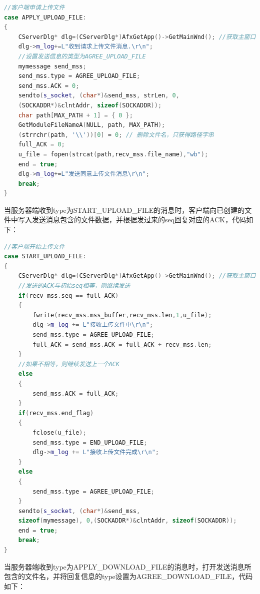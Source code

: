 \begin{flushleft}
\begin{lstlisting}[language={C++},basicstyle=\footnotesize]
//客户端申请上传文件
case APPLY_UPLOAD_FILE:
{
	CServerDlg* dlg=(CServerDlg*)AfxGetApp()->GetMainWnd(); //获取主窗口
	dlg->m_log+=L"收到请求上传文件消息.\r\n";
	//设置发送信息的类型为AGREE_UPLOAD_FILE
	mymessage send_mss;
	send_mss.type = AGREE_UPLOAD_FILE;
	send_mss.ACK = 0;
	sendto(s_socket, (char*)&send_mss, strLen, 0,
    (SOCKADDR*)&clntAddr, sizeof(SOCKADDR));
	char path[MAX_PATH + 1] = { 0 };
	GetModuleFileNameA(NULL, path, MAX_PATH);
	(strrchr(path, '\\'))[0] = 0; // 删除文件名，只获得路径字串
	full_ACK = 0;
	u_file = fopen(strcat(path,recv_mss.file_name),"wb");
	end = true;
	dlg->m_log+=L"发送同意上传文件消息\r\n";
	break;
}
\end{lstlisting}
\end{flushleft}

当服务器端收到type为START\_UPLOAD\_FILE的消息时，客户端向已创建的文件中写入发送消息包含的文件数据，并根据发过来的seq回复对应的ACK，代码如下：

\begin{flushleft}
\begin{lstlisting}[language={C++},basicstyle=\footnotesize]
//客户端开始上传文件
case START_UPLOAD_FILE:
{
	CServerDlg* dlg=(CServerDlg*)AfxGetApp()->GetMainWnd(); //获取主窗口
	//发送的ACK与初始seq相等，则继续发送
	if(recv_mss.seq == full_ACK)
	{
		fwrite(recv_mss.mss_buffer,recv_mss.len,1,u_file);
		dlg->m_log += L"接收上传文件中\r\n";
		send_mss.type = AGREE_UPLOAD_FILE;
		full_ACK = send_mss.ACK = full_ACK + recv_mss.len;
	}
	//如果不相等，则继续发送上一个ACK
	else
	{
		send_mss.ACK = full_ACK;
	}
	if(recv_mss.end_flag)
	{
		fclose(u_file);
		send_mss.type = END_UPLOAD_FILE;
		dlg->m_log += L"接收上传文件完成\r\n";
	}
	else
	{
		send_mss.type = AGREE_UPLOAD_FILE;
	}
	sendto(s_socket, (char*)&send_mss, 
    sizeof(mymessage), 0,(SOCKADDR*)&clntAddr, sizeof(SOCKADDR));
	end = true;
	break;
}
\end{lstlisting}
\end{flushleft}

当服务器端收到type为APPLY\_DOWNLOAD\_FILE的消息时，打开发送消息所包含的文件名，并将回复信息的type设置为AGREE\_DOWNLOAD\_FILE，代码如下：

